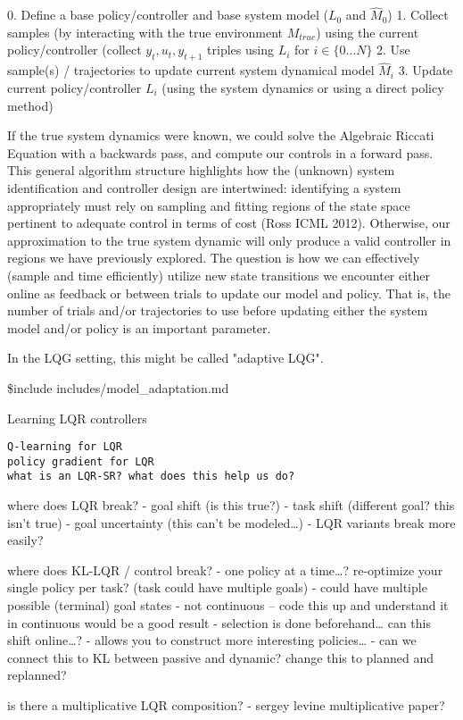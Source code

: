 0. Define a base policy/controller and base system model ($L_0$ and $\hat{M}_0$)
1. Collect samples (by interacting with the true environment $M_{true}$) using the current policy/controller (collect $y_t,u_t,y_{t+1}$ triples using $L_i$ for $i \in \{0\dots N\}$
2. Use sample(s) / trajectories to update current system dynamical model $\hat{M}_i$
3. Update current policy/controller $L_i$ (using the system dynamics or using a direct policy method)

If the true system dynamics were known, we could solve the Algebraic Riccati Equation with a backwards pass, and compute our controls in a forward pass. This general algorithm structure highlights how the (unknown) system identification and controller design are intertwined: identifying a system appropriately must rely on sampling and fitting regions of the state space pertinent to adequate control in terms of cost (Ross ICML 2012). Otherwise, our approximation to the true system dynamic will only produce a valid controller in regions we have previously explored. The question is how we can effectively (sample and time efficiently) utilize new state transitions we encounter either online as feedback or between trials to update our model and policy. That is, the number of trials and/or trajectories to use before updating either the system model and/or policy is an important parameter.

In the LQG setting, this might be called "adaptive LQG".

\$include includes/model\_adaptation.md

Learning LQR controllers

\begin{verbatim}
Q-learning for LQR
policy gradient for LQR
what is an LQR-SR? what does this help us do?
\end{verbatim}

where does LQR break? - goal shift (is this true?) - task shift
(different goal? this isn't true) - goal uncertainty (this can't be
modeled\ldots) - LQR variants break more easily?

where does KL-LQR / control break? - one policy at a time\ldots?
re-optimize your single policy per task? (task could have multiple
goals) - could have multiple possible (terminal) goal states - not
continuous -- code this up and understand it in continuous would be a
good result - selection is done beforehand\ldots{} can this shift
online\ldots? - allows you to construct more interesting
policies\ldots{} - can we connect this to KL between passive and
dynamic? change this to planned and replanned?

is there a multiplicative LQR composition? - sergey levine
multiplicative paper?
